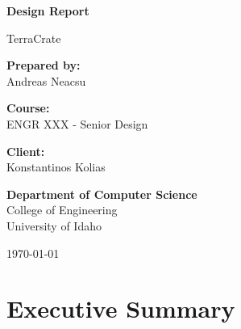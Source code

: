 \documentclass[12pt,letterpaper]{report}
\begin{document}
\begin{titlepage}
    \centering
    \vspace*{1cm}
    
    
    \vspace{1.5cm}
    
    {\huge\bfseries Design Report\par}
    \vspace{0.5cm}
    {\Large TerraCrate \par}
    
    \vspace{2cm}
    
    {\large
    \textbf{Prepared by:}\\
    \vspace{0.3cm}
    Andreas Neacsu\\
    \vspace{1cm}
    
    \textbf{Course:}\\
    ENGR XXX - Senior Design\\
    \vspace{0.5cm}
    
    \textbf{Client:}\\
    Konstantinos Kolias\\
    \vspace{1cm}
    
    \textbf{Department of Computer Science}\\
    College of Engineering\\
    University of Idaho\\
    \vspace{1cm}
    
    \today
    }
    
    \vfill
    
\end{titlepage}

\tableofcontents
\newpage

\chapter*{Executive Summary }
\end{document}
